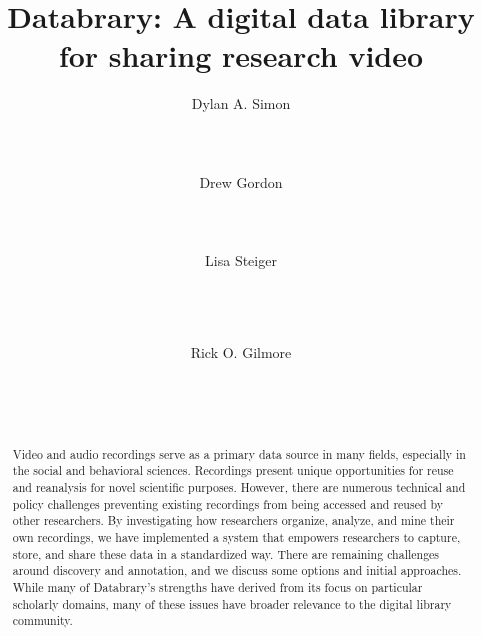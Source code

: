 \documentclass{sig-alternate}
\begin{document}

\title{Databrary: A digital data library for sharing research video}


\author{
\alignauthor
Dylan A. Simon\\
	\\
	\\
	\\
\alignauthor
Drew Gordon\\
	\\
	\\
	\\
\alignauthor
Lisa Steiger\\
	\\
	\\
	\\
\and
Rick O. Gilmore\\
	\\
	\\
	\\
}

\maketitle

\begin{abstract}
Video and audio recordings serve as a primary data source in many fields, especially in the social and behavioral sciences.
Recordings present unique opportunities for reuse and reanalysis for novel scientific purposes.
However, there are numerous technical and policy challenges preventing existing recordings from being accessed and reused by other researchers.
By investigating how researchers organize, analyze, and mine their own recordings, we have implemented a system that empowers researchers to capture, store, and share these data in a standardized way.
There are remaining challenges around discovery and annotation, and we discuss some options and initial approaches.
While many of Databrary's strengths have derived from its focus on particular scholarly domains, many of these issues have broader relevance to the digital library community.
\end{abstract}
\end{document}
